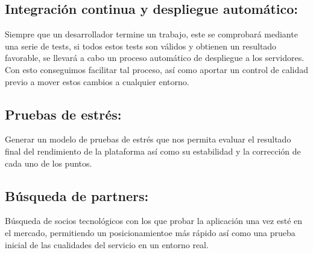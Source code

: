 \subsection{Integración continua y despliegue automático:} Siempre que un
desarrollador termine un trabajo, este se comprobará mediante una serie de
tests, si todos estos tests son válidos y obtienen un resultado favorable, se
llevará a cabo un proceso automático de despliegue a los servidores. Con esto
conseguimos facilitar tal proceso, así como aportar un control de calidad previo
a mover estos cambios a cualquier entorno.

\subsection{Pruebas de estrés:} Generar un modelo de pruebas de estrés que nos
permita evaluar el resultado final del rendimiento de la plataforma así como su
estabilidad y la corrección de cada uno de los puntos.

\subsection{Búsqueda de partners:} Búsqueda de socios tecnológicos con los que
probar la aplicación una vez esté en el mercado, permitiendo un posicionamientoe
más rápido así como una prueba inicial de las cualidades del servicio en un
entorno real.





